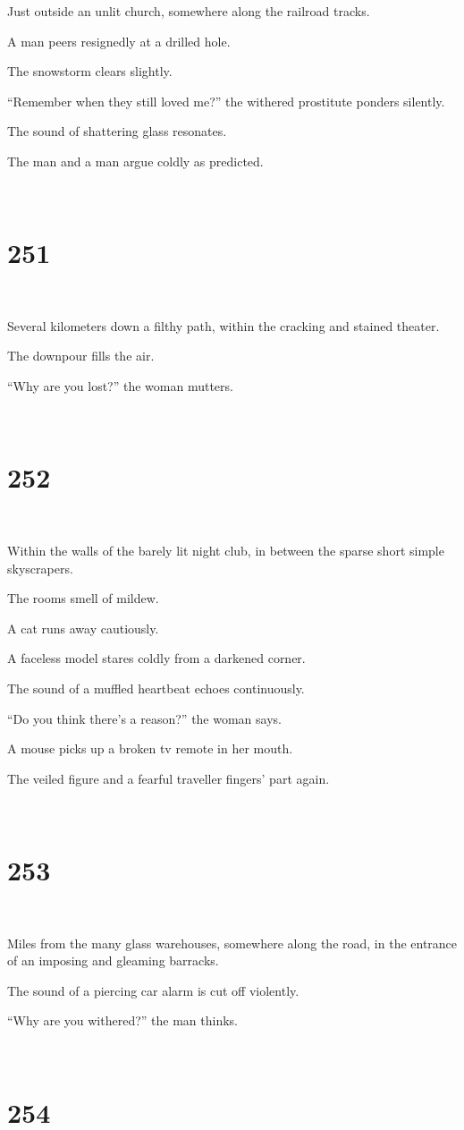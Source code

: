 \documentclass{report}
\begin{document}
Just outside an unlit church, somewhere along the railroad tracks.

A man peers resignedly at a drilled hole.

The snowstorm clears slightly.

``Remember when they still loved me?'' the withered prostitute ponders silently.

The sound of shattering glass resonates.

The man and a man argue coldly as predicted.

~
\chapter*{251}
~

Several kilometers down a filthy path, within the cracking and stained theater.

The downpour fills the air.

``Why are you lost?'' the woman mutters.

~
\chapter*{252}
~

Within the walls of the barely lit night club, in between the sparse short simple skyscrapers.

The rooms smell of mildew.

A cat runs away cautiously.

A faceless model stares coldly from a darkened corner.

The sound of a muffled heartbeat echoes continuously.

``Do you think there's a reason?'' the woman says.

A mouse picks up a broken tv remote in her mouth.

The veiled figure and a fearful traveller fingers' part again.

~
\chapter*{253}
~

Miles from the many glass warehouses, somewhere along the road, in the entrance of an imposing and gleaming barracks.

The sound of a piercing car alarm is cut off violently.

``Why are you withered?'' the man thinks.

~
\chapter*{254}
~
\end{document}
